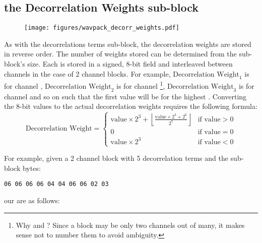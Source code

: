\clearpage

\subsection{the Decorrelation Weights sub-block}
\begin{figure}[h]
\texttt{[image: figures/wavpack\_decorr\_weights.pdf]}
\end{figure}
\par
\noindent
As with the decorrelations terms sub-block,
the decorrelation weights are stored in reverse order.
The number of weights stored can be determined from the sub-block's
size.
Each is stored in a signed, 8-bit field and interleaved between
channels in the case of 2 channel blocks.
For example, $\text{Decorrelation Weight}_1$ is for channel ,
$\text{Decorrelation Weight}_2$ is for channel
\footnote{Why  and ?
Since a block may be only two channels out of many,
it makes sense not to number them to avoid ambiguity.},
$\text{Decorrelation Weight}_3$ is for channel  and so on
such that the first value will be for the highest
.
Converting the 8-bit values to the actual decorrelation weights
requires the following formula:
\begin{equation*}
\text{Decorrelation Weight} =
\begin{cases}
\text{value} \times 2 ^ 3 + \left\lfloor\frac{\text{value} \times 2 ^ 3 + 2 ^ 6}{2 ^ 7}\right\rfloor & \text{if value} > 0 \\
0 & \text{if value} = 0 \\
\text{value} \times 2 ^ 3 & \text{if value} < 0
\end{cases}
\end{equation*}
\par
\noindent
For example, given a 2 channel block with 5 decorrelation terms and the
sub-block bytes:
\begin{Verbatim}[frame=single]
06 06 06 06 04 04 06 06 02 03
\end{Verbatim}
our  are as follows:
